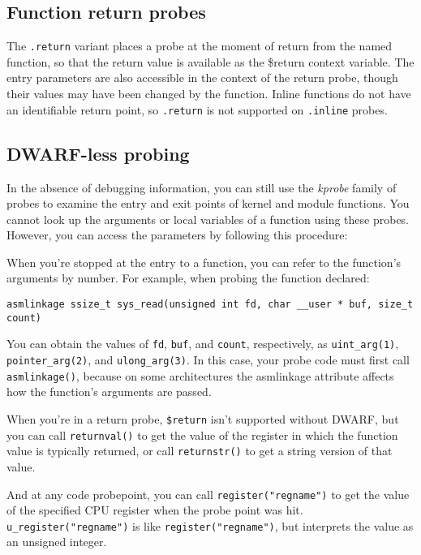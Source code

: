 \documentclass[twoside,english]{article}
\newenvironment{vindent}
{\begin{list}{}{\setlength{\listparindent}{6pt}}
\item[]}
{\end{list}}
\begin{document}
\subsection{Function return probes}
The \texttt{.return} variant places a probe at the moment of return from
the named function, so that the return value is available as the \$return
context variable. The entry parameters are also accessible in the context
of the return probe, though their values may have been changed by the function.
Inline functions do not have an identifiable return point, so \texttt{.return}
is not supported on \texttt{.inline} probes.

\subsection{DWARF-less probing}

In the absence of debugging information, you can still use the
\emph{kprobe} family of probes to examine the entry and exit points of
kernel and module functions. You cannot look up the arguments or local
variables of a function using these probes. However, you can access
the parameters by following this procedure:

When you're stopped at the entry to a function, you can refer to the
function's arguments by number. For example, when probing the function
declared:

\begin{vindent}
\begin{verbatim}
asmlinkage ssize_t sys_read(unsigned int fd, char __user * buf, size_t
count)
\end{verbatim}
\end{vindent}

You can obtain the values of \texttt{fd}, \texttt{buf}, and
\texttt{count}, respectively, as \texttt{uint\_arg(1)},
\texttt{pointer\_arg(2)}, and \texttt{ulong\_arg(3)}. In this case, your
probe code must first call \texttt{asmlinkage()}, because on some
architectures the asmlinkage attribute affects how the function's
arguments are passed.

When you're in a return probe, \texttt{\$return} isn't supported
without DWARF, but you can call \texttt{returnval()} to get the value
of the register in which the function value is typically returned, or
call \texttt{returnstr()} to get a string version of that value.

And at any code probepoint, you can call
\texttt{{register("regname")}} to get the value of the specified CPU
register when the probe point was hit.
\texttt{u\_register("regname")} is like \texttt{register("regname")},
but interprets the value as an unsigned integer.
\end{document}
